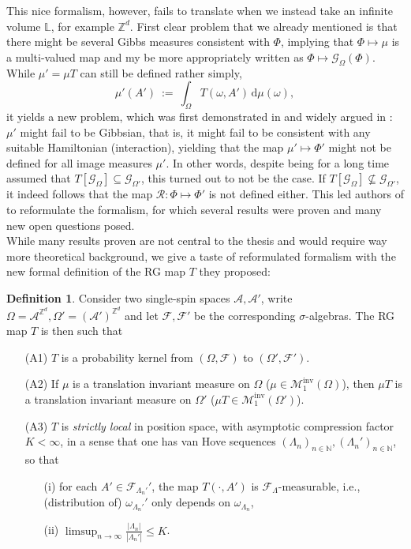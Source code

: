 \documentclass[12pt]{article}
\newcommand{\A}{\mathcal{A}}
\renewcommand{\d}{\mathrm{d}}
\newcommand{\F}{\mathcal{F}}
\newcommand{\G}{\mathcal{G}}
\renewcommand{\L}{\mathbb{L}}
\newcommand{\M}{\mathcal{M}}
\newcommand{\N}{\mathbb{N}}
\newcommand{\RR}{\mathcal{R}}
\newcommand{\Z}{\mathbb{Z}}
\newcommand{\ra}{\rightarrow}
\newcommand{\pika}{\boldsymbol{\cdot}}
\newcommand{\1}{\mathbbm{1}}
\newcommand{\5}{\vspace{0.5cm}}
\theoremstyle{definition}
\newtheorem{df}[thm]{Definition}
\begin{document}
This nice formalism, however, fails to translate when we instead take an infinite volume $\L$, for example $\Z^d$. First clear problem that we already mentioned is that there might be several Gibbs measures consistent with $\Phi$, implying that $\Phi\mapsto\mu$ is a multi-valued map and my be more appropriately written as $\Phi\mapsto\G_\Omega(\Phi)$. While $\mu'=\mu T$ can still be defined rather simply,
$$\mu'(A') ~:=~ \int_\Omega T(\omega,A')\,\d\mu(\omega),$$
it yields a new problem, which was first demonstrated in \cite{Isr} and widely argued in \cite{EFS}: $\mu'$ might fail to be Gibbsian, that is, it might fail to be consistent with any suitable Hamiltonian (interaction), yielding that the map $\mu'\mapsto\Phi'$ might not be defined for all image measures $\mu'$. In other words, despite being for a long time assumed that $T[\G_\Omega]\subseteq\G_{\Omega'}$, this turned out to not be the case. If $T[\G_\Omega]\not\subseteq\G_{\Omega'}$, it indeed follows that the map $\RR:\Phi\mapsto\Phi'$ is not defined either. This led authors of \cite{EFS} to reformulate the formalism, for which several results were proven and many new open questions posed. \\

While many results proven are not central to the thesis and would require way more theoretical background, we give a taste of reformulated formalism with the new formal definition of the RG map $T$ they proposed:
\begin{df}
Consider two single-spin spaces $\A,\A'$, write $\Omega=\A^{\Z^d},\Omega'=(\A')^{\Z^{d}}$ and let $\F,\F'$ be the corresponding $\sigma$-algebras. The RG map $T$ is then such that 
\begin{itemize}
	\item[(A1)] $T$ is a probability kernel from $(\Omega,\F)$ to $(\Omega',\F')$.
	\item[(A2)] If $\mu$ is a translation invariant measure on $\Omega$ ($\mu\in\M_1^{\mathrm{inv}}(\Omega)$), then $\mu T$ is a translation invariant measure on $\Omega'$ ($\mu T\in\M_1^{\mathrm{inv}}(\Omega')$).
	\item[(A3)] $T$ is \textit{strictly local} in position space, with asymptotic compression factor $K<\infty$, in a sense that one has van Hove sequences $(\Lambda_n)_{n\in\N},(\Lambda_n')_{n\in\N}$, so that
	\begin{itemize}
		\item[(i)] for each $A'\in\F_{\Lambda_n'}'$, the map $T(\pika,A')$ is $\F_\Lambda$-measurable, i.e., (distribution of) $\omega_{\Lambda_n'}'$ only depends on $\omega_{\Lambda_n}$,
		\item[(ii)] $\limsup_{n\ra\infty}\frac{|\Lambda_n|}{|\Lambda_n'|}\leq K$.
	\end{itemize}
\end{itemize}
\end{df}
\end{document}
